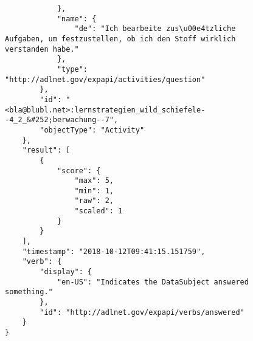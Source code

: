 \begin{figure}
    \begin{lstlisting}
            },
            "name": {
                "de": "Ich bearbeite zus\u00e4tzliche Aufgaben, um festzustellen, ob ich den Stoff wirklich verstanden habe."
            },
            "type": "http://adlnet.gov/expapi/activities/question"
        },
        "id": "<bla@blubl.net>:lernstrategien_wild_schiefele--4_2_&#252;berwachung--7",
        "objectType": "Activity"
    },
    "result": [
        {
            "score": {
                "max": 5,
                "min": 1,
                "raw": 2,
                "scaled": 1
            }
        }
    ],
    "timestamp": "2018-10-12T09:41:15.151759",
    "verb": {
        "display": {
            "en-US": "Indicates the DataSubject answered something."
        },
        "id": "http://adlnet.gov/expapi/verbs/answered"
    }
}                 
    \end{lstlisting}
\end{figure}